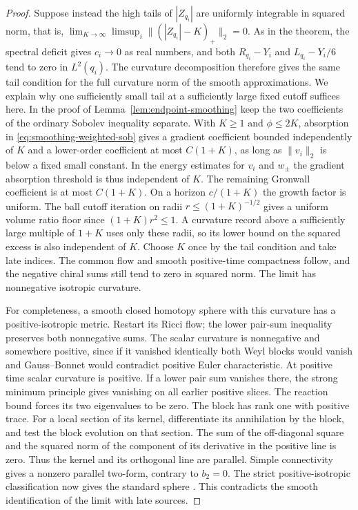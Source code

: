 \begin{proof}
Suppose instead the high tails of \(|Z_{q_i}|\) are uniformly
integrable in squared norm, that is,
\(\lim_{K\to\infty}\limsup_i\|(|Z_{q_i}|-K)_+\|_2=0\).
As in the theorem, the spectral deficit gives \(c_i\to0\) as real
numbers, and both \(R_{q_i}-Y_i\) and \(L_{q_i}-Y_i/6\) tend to zero
in \(L^2(q_i)\).
The curvature decomposition therefore gives the same tail condition
for the full curvature norm of the smooth approximations.
We explain why one sufficiently small tail at a sufficiently large
fixed cutoff suffices here. In the proof of
Lemma~\ref{lem:endpoint-smoothing} keep the two coefficients of the
ordinary Sobolev inequality separate. With \(K\ge1\) and
\(\phi\le2K\), absorption in \eqref{eq:smoothing-weighted-sob}
gives a gradient coefficient bounded independently of \(K\) and
a lower-order coefficient at most \(C(1+K)\), as long as
\(\|v_i\|_2\) is below a fixed small constant. In the energy
estimates for \(v_i\) and \(w_\pm\) the gradient absorption
threshold is thus independent of \(K\). The remaining Gronwall
coefficient is at most \(C(1+K)\). On a horizon \(c/(1+K)\)
the growth factor is uniform. The ball cutoff iteration on radii
\(r\le(1+K)^{-1/2}\) gives a uniform volume ratio floor since
\((1+K)r^2\le1\). A curvature record above a sufficiently large
multiple of \(1+K\) uses only these radii, so its lower bound on
the squared excess is also independent of \(K\).
Choose \(K\) once by the tail condition and take late indices.
The common flow and smooth positive-time compactness follow,
and the negative chiral sums still tend to zero in squared norm.
The limit has nonnegative isotropic curvature.

For completeness, a smooth closed homotopy sphere with this curvature
has a positive-isotropic metric. Restart its Ricci flow; the lower
pair-sum inequality preserves both nonnegative sums. The scalar
curvature is nonnegative and somewhere positive, since if it vanished
identically both Weyl blocks would vanish and Gauss--Bonnet would
contradict positive Euler characteristic. At positive time scalar
curvature is positive. If a lower pair sum vanishes there, the
strong minimum principle gives vanishing on all earlier positive
slices. The reaction bound forces its two eigenvalues to be zero.
The block has rank one with positive trace. For a local section of
its kernel, differentiate its annihilation by the block, and test
the block evolution on that section. The sum of the off-diagonal
square and the squared norm of the component of its derivative in
the positive line is zero. Thus the kernel and its orthogonal line
are parallel. Simple connectivity gives a nonzero parallel two-form,
contrary to \(b_2=0\). The strict positive-isotropic classification
now gives the standard sphere \cite[Main Theorem]{ChenTangZhu2012}.
This contradicts the smooth identification of the limit with
late sources.


\end{proof}
